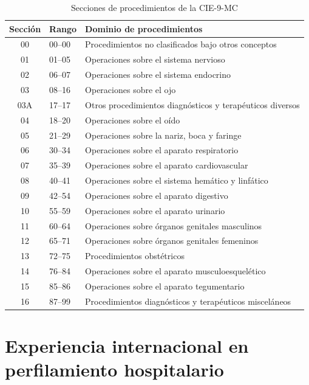 \begin{table}[H]
\centering
\caption{Secciones de procedimientos de la CIE-9-MC}
\label{tab:cie9-secciones}
\begin{tabular}{cll}
\hline
\textbf{Sección} & \textbf{Rango} & \textbf{Dominio de procedimientos} \\
\hline
00  & 00--00 & Procedimientos no clasificados bajo otros conceptos \\
01  & 01--05 & Operaciones sobre el sistema nervioso \\
02  & 06--07 & Operaciones sobre el sistema endocrino \\
03  & 08--16 & Operaciones sobre el ojo \\
03A & 17--17 & Otros procedimientos diagnósticos y terapéuticos diversos \\
04  & 18--20 & Operaciones sobre el oído \\
05  & 21--29 & Operaciones sobre la nariz, boca y faringe \\
06  & 30--34 & Operaciones sobre el aparato respiratorio \\
07  & 35--39 & Operaciones sobre el aparato cardiovascular \\
08  & 40--41 & Operaciones sobre el sistema hemático y linfático \\
09  & 42--54 & Operaciones sobre el aparato digestivo \\
10  & 55--59 & Operaciones sobre el aparato urinario \\
11  & 60--64 & Operaciones sobre órganos genitales masculinos \\
12  & 65--71 & Operaciones sobre órganos genitales femeninos \\
13  & 72--75 & Procedimientos obstétricos \\
14  & 76--84 & Operaciones sobre el aparato musculoesquelético \\
15  & 85--86 & Operaciones sobre el aparato tegumentario \\
16  & 87--99 & Procedimientos diagnósticos y terapéuticos misceláneos \\
\hline
\end{tabular}
\end{table}

\section{Experiencia internacional en perfilamiento hospitalario}

\label{sec:internacional}

